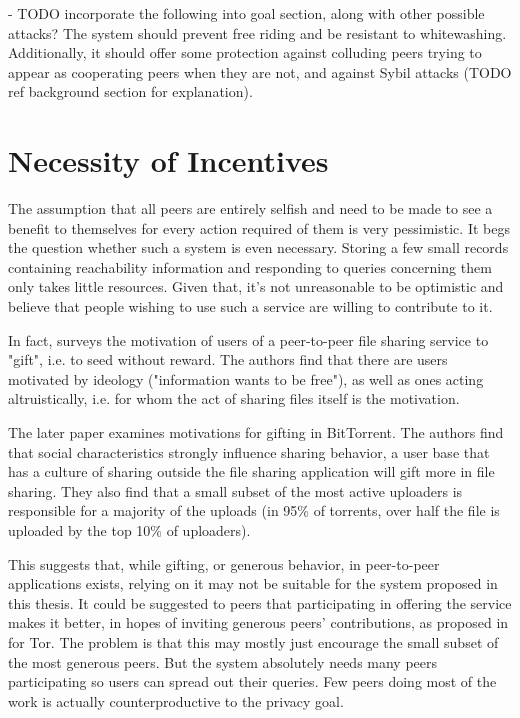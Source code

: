 - TODO incorporate the following into goal section, along with other possible
  attacks?
The system should prevent free riding and be resistant to whitewashing.
Additionally, it should offer some protection against colluding peers trying to
appear as cooperating peers when they are not, and against Sybil attacks (TODO
ref background section for explanation).

\section{Necessity of Incentives}
The assumption that all peers are entirely selfish and need to be made to see a
benefit to themselves for every action required of them is very pessimistic. It
begs the question whether such a system is even necessary. Storing a few small
records containing reachability information and responding to queries concerning
them only takes little resources. Given that, it's not unreasonable to be
optimistic and believe that people wishing to use such a service are willing to
contribute to it.

In fact, \cite{mcgee2004gifting} surveys the motivation of users of a
peer-to-peer file sharing service to "gift", i.e. to seed without reward. The
authors find that there are users motivated by ideology ("information wants to
be free"), as well as ones acting altruistically, i.e. for whom the act of
sharing files itself is the motivation.

The later paper \cite{ripeanu2006gifting} examines motivations for gifting in
BitTorrent. The authors find that social characteristics strongly influence
sharing behavior, a user base that has a culture of sharing outside the file
sharing application will gift more in file sharing. They also find that a small
subset of the most active uploaders is responsible for a majority of the uploads
(in 95\% of torrents, over half the file is uploaded by the top 10\% of
uploaders).

This suggests that, while gifting, or generous behavior, in peer-to-peer
applications exists, relying on it may not be suitable for the system proposed
in this thesis. It could be suggested to peers that participating in offering
the service makes it better, in hopes of inviting generous peers' contributions,
as proposed in \cite{arma2009incentive_tor} for Tor. The problem is that this
may mostly just encourage the small subset of the most generous peers. But the
system absolutely needs many peers participating so users can spread out their
queries. Few peers doing most of the work is actually counterproductive to the
privacy goal.

